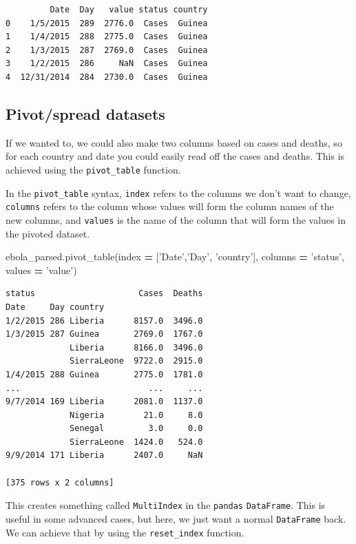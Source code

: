 \documentclass[
  letterpaper,
]{scrbook}
\newenvironment{Shaded}{\begin{snugshade}}{\end{snugshade}}
\newcommand{\NormalTok}[1]{#1}
\newcommand{\OperatorTok}[1]{\textcolor[rgb]{0.81,0.36,0.00}{\textbf{#1}}}
\newcommand{\StringTok}[1]{\textcolor[rgb]{0.31,0.60,0.02}{#1}}
\begin{document}
\begin{verbatim}
         Date  Day   value status country
0    1/5/2015  289  2776.0  Cases  Guinea
1    1/4/2015  288  2775.0  Cases  Guinea
2    1/3/2015  287  2769.0  Cases  Guinea
3    1/2/2015  286     NaN  Cases  Guinea
4  12/31/2014  284  2730.0  Cases  Guinea
\end{verbatim}

\hypertarget{pivotspread-datasets}{%
\subsection{Pivot/spread datasets}\label{pivotspread-datasets}}

If we wanted to, we could also make two columns based on cases and deaths, so for each country and date you could easily read off the cases and deaths. This is achieved using the \texttt{pivot\_table} function.

In the \texttt{pivot\_table} syntax, \texttt{index} refers to the columns we don't want to change, \texttt{columns} refers to the column whose values will form the column names of the new columns, and \texttt{values} is the name of the column that will form the values in the pivoted dataset.

\begin{Shaded}
\begin{Highlighting}[]
\NormalTok{ebola_parsed.pivot_table(index }\OperatorTok{=}\NormalTok{ [}\StringTok{'Date'}\NormalTok{,}\StringTok{'Day'}\NormalTok{, }\StringTok{'country'}\NormalTok{], columns }\OperatorTok{=} \StringTok{'status'}\NormalTok{, values }\OperatorTok{=} \StringTok{'value'}\NormalTok{)}
\end{Highlighting}
\end{Shaded}

\begin{verbatim}
status                     Cases  Deaths
Date     Day country                    
1/2/2015 286 Liberia      8157.0  3496.0
1/3/2015 287 Guinea       2769.0  1767.0
             Liberia      8166.0  3496.0
             SierraLeone  9722.0  2915.0
1/4/2015 288 Guinea       2775.0  1781.0
...                          ...     ...
9/7/2014 169 Liberia      2081.0  1137.0
             Nigeria        21.0     8.0
             Senegal         3.0     0.0
             SierraLeone  1424.0   524.0
9/9/2014 171 Liberia      2407.0     NaN

[375 rows x 2 columns]
\end{verbatim}

This creates something called \texttt{MultiIndex} in the \texttt{pandas} \texttt{DataFrame}. This is useful in some advanced cases, but here, we just want a normal \texttt{DataFrame} back. We can achieve that by using the \texttt{reset\_index} function.
\end{document}
